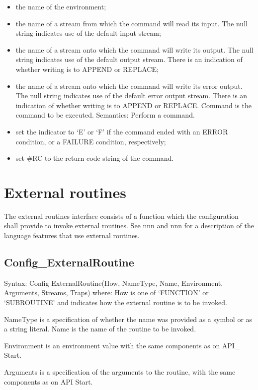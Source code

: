 \begin{itemize}
\item
  the name of the environment;
\item
  the name of a stream from which the command will read its input. The
  null string indicates use of the default input stream;
\item
  the name of a stream onto which the command will write its output. The
  null string indicates use of the default output stream. There is an
  indication of whether writing is to APPEND or REPLACE;
\item
  the name of a stream onto which the command will write its error
  output. The null string indicates use of the default error output
  stream. There is an indication of whether writing is to APPEND or
  REPLACE. Command is the command to be executed. Semantics: Perform a
  command.
\item
  set the indicator to `E' or `F' if the command ended with an ERROR
  condition, or a FAILURE condition, respectively;
\item
  set \#RC to the return code string of the command.
\end{itemize}

\section{External routines}\label{external-routines}

The external routines interface consists of a function which the
configuration shall provide to invoke external routines. See nnn and nnn
for a description of the language features that use external routines.

\subsection{Config\_ExternalRoutine}\label{config_externalroutine}

Syntax: Config ExternalRoutine(How, NameType, Name, Environment,
Arguments, Streams, Traps) where: How is one of `FUNCTION' or
`SUBROUTINE' and indicates how the external routine is to be invoked.

NameType is a specification of whether the name was provided as a symbol
or as a string literal. Name is the name of the routine to be invoked.

Environment is an environment value with the same components as on API\_
Start.

Arguments is a specification of the arguments to the routine, with the
same components as on API Start.

